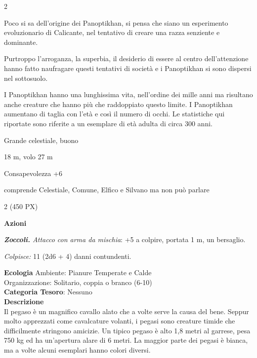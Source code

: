 \begin{multicols}{2}
{Poco si sa dell'origine dei Panoptikhan, si pensa che siano un esperimento evoluzionario di Calicante, nel tentativo di creare una razza senziente e dominante.

Purtroppo l'arroganza, la superbia, il desiderio di essere al centro dell'attenzione hanno fatto naufragare questi tentativi di società e i Panoptikhan si sono dispersi nel sottosuolo.

I Panoptikhan hanno una lunghissima vita, nell'ordine dei mille anni ma risultano anche creature che hanno più che raddoppiato questo limite. I Panoptikhan aumentano di taglia con l'età e così il numero di occhi. Le statistiche qui riportate sono riferite a un esemplare di età adulta di circa 300 anni.

\begin{description}[noitemsep, topsep=0pt, parsep=0pt, partopsep=0pt, itemsep=1pt, leftmargin=2.35cm,  labelwidth=2.2cm, itemindent=0cm, listparindent=0pt] %
\setlength{\baselineskip}{10pt}
\item[\textbf{Taglia/Tipo}] Grande celestiale, buono
\item[\textbf{Caratt.}] 
\item[\textbf{Punti Ferita}] 
\item[\textbf{Movimento}] 18 m, volo 27 m
\item[\textbf{Tiri Salvez.}] 
\item[\textbf{Comp.}] Consapevolezza +6
\item[\textbf{Linguaggi}] comprende Celestiale, Comune, Elfico e Silvano ma non può parlare
\item[\textbf{Sfida}] 2 (450 PX)
\end{description}
\smallskip

\textbf{Azioni}

\emph{\textbf{Zoccoli.} Attacco con arma da mischia}: +5 a colpire, portata 1 m, un bersaglio.

\emph{Colpisce:} 11 (2d6 + 4) danni contundenti.

\textbf{Ecologia}
Ambiente: Pianure Temperate e Calde\\
Organizzazione: Solitario, coppia o branco (6-10)\\
\textbf{Categoria Tesoro}: Nessuno\\
\textbf{Descrizione}\\
Il pegaso è un magnifico cavallo alato che a volte serve la causa del bene. Seppur molto apprezzati come cavalcature volanti, i pegasi sono creature timide che difficilmente stringono amicizie. Un tipico pegaso è alto 1,8 metri al garrese, pesa 750 kg ed ha un'apertura alare di 6 metri. La maggior parte dei pegasi è bianca, ma a volte alcuni esemplari hanno colori diversi.

}
\end{multicols}
